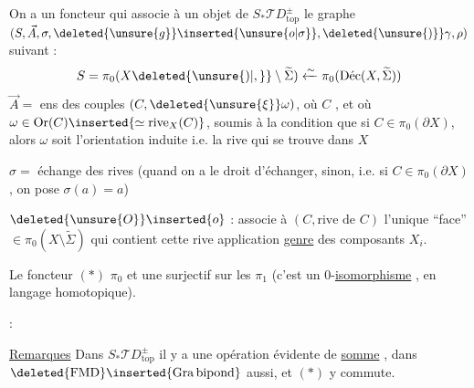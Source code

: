 
On a un foncteur
qui associe à un objet  de
$S_*\mathcal TD^\pm_{\mathrm{top}}$ le graphe 
$(S,\vec A,\sigma,\deleted{\unsure{g}}\inserted{\unsure{o|\sigma}},\deleted{\unsure{)}}\gamma,\rho)$ suivant :
\[
S=\pi_0(X\deleted{\unsure{)|,}}\setminus\widetilde\Sigma)\xleftarrow{\sim}\pi_0(\text{Déc}(X,\widetilde\Sigma))
\]
$\vec A=$ ens des couples $(C,\deleted{\unsure{\xi}}\omega)$, où
$C$ , et où
$\omega\in\mathrm{Or}(C)\inserted{\simeq\mathrm{rive}_X(C)}$,
soumis à la condition que si $C\in\pi_0(\partial X)$, alors $\omega$
soit l'orientation induite i.e. la rive qui se trouve dans $X$

$\sigma=$ échange des rives (quand on a le droit d'échanger,
sinon, i.e. si $C\in\pi_0(\partial X)$, on pose $\sigma(a)=a$)

$\deleted{\unsure{O}}\inserted{o}$ : associe à $(C,\text{rive de }C)$
l'unique ``face'' $\in\pi_0(X\setminus\widetilde\Sigma)$ qui
 contient cette rive
application \uline{genre} des composants $X_i$.

Le foncteur $(*)$ 
 $\pi_0$ et une surjectif
sur les $\pi_1$ (c'est un 0-\uline{isomorphisme} ,
en langage homotopique).

 :

\uline{Remarques} Dans $S_*\mathcal TD^\pm_{\mathrm{top}}$ il y a une
opération évidente de \uline{somme} ,
dans $\deleted{\mathrm{FMD}}\inserted{\mathrm{Gra\,bipond}}$ aussi,
et $(*)$ y commute.

